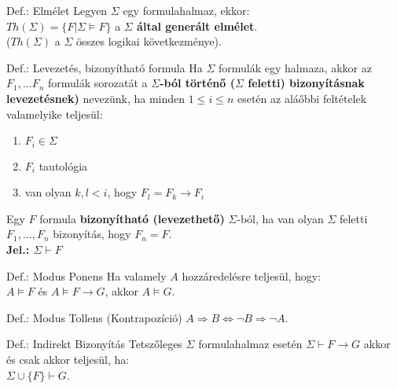 \documentclass{beamer}
\begin{document}
\begin{frame}

\begin{block}{Def.: Elmélet}
Legyen $\Sigma$ egy formulahalmaz, ekkor:\\
\smallskip
$Th({\Sigma}) = \{F | \Sigma \models F\}$ a \textbf{$\Sigma$ által generált elmélet}.\\
($Th({\Sigma})$ a $\Sigma$ összes logikai következménye).
\end{block}

\begin{block}{Def.: Levezetés, bizonyítható formula}
Ha $\Sigma$ formulák egy halmaza, akkor az $F_1, ... F_n$ formulák sorozatát a \textbf{$\Sigma$-ból történő ($\Sigma$ feletti) bizonyításnak levezetésnek)} nevezünk, ha minden $1 \leq i \leq n$ esetén az aláőbbi feltételek valamelyike teljesül:\\
\begin{enumerate}
\item $F_i \in \Sigma$
\item $F_i$ tautológia
\item van olyan $k, l < i$, hogy $F_l = F_k \rightarrow F_i$
\end{enumerate}
\bigskip
Egy $F$ formula \textbf{bizonyítható (levezethető)} $\Sigma$-ból, ha van olyan $\Sigma$ feletti $F_1, ..., F_n$ bizonyítás, hogy $F_n = F$.\\
\bigskip
\textbf{Jel.: $\Sigma \vdash F$}
\end{block}

\end{frame}

\begin{frame}

\begin{block}{Def.: Modus Ponens}
Ha valamely $A$ hozzáredelésre teljesül, hogy:\\
$A \models F$ és $A \models F \rightarrow G$, akkor $A \models G$.
\end{block}

\begin{block}{Def.: Modus Tollens (Kontrapozíció)}
$A \Rightarrow B \iff {\neg}B \Rightarrow {\neg}A$.
\end{block}

\begin{block}{Def.: Indirekt Bizonyítás}
Tetszőleges $\Sigma$ formulahalmaz esetén $\Sigma \vdash F \rightarrow G$ akkor és csak akkor teljesül, ha:\\
$\Sigma \cup \{F\} \vdash G$.
\end{block}

\end{frame}
\end{document}
